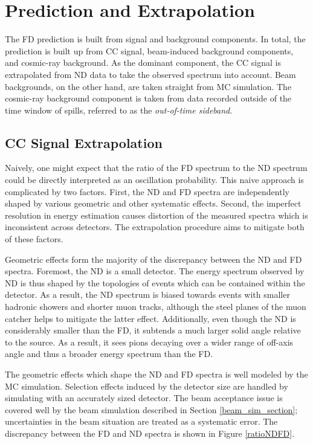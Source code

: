 \section{Prediction and Extrapolation}
\label{extrap_section}

The FD prediction is built from signal and background components.
In total, the prediction is built up from \numu CC signal, beam-induced
background components, and cosmic-ray background.
As the dominant component, the \numu CC signal is extrapolated from
ND data to take the observed spectrum into account.
Beam backgrounds, on the other hand, are taken straight from MC simulation.
The cosmic-ray background component is taken from data recorded
outside of the time window of \numi spills, referred to as the
\textit{out-of-time sideband}.

\subsection{\numu CC Signal Extrapolation}
\label{sig_extrap_section}
Naively, one might expect that the ratio of the FD spectrum to the ND spectrum
could be directly interpreted as an oscillation probability.
This naive approach is complicated by two factors.
First, the ND and FD spectra are independently shaped by various geometric
and other systematic effects.
Second, the imperfect resolution in energy estimation causes
distortion of the measured spectra which is inconsistent across detectors.
The extrapolation procedure aims to mitigate both of these factors.

Geometric effects form the majority of the discrepancy between the
ND and FD spectra.
Foremost, the ND is a small detector.
The energy spectrum observed by ND is thus shaped by the topologies
of events which can be contained within the detector.
As a result, the ND spectrum is biased towards events with
smaller hadronic showers and shorter muon tracks, although the steel planes
of the muon catcher helps to mitigate the latter effect.
Additionally, even though the ND is considerably smaller than the FD,
it subtends a much larger solid angle relative to the \numi source.
As a result, it sees pions decaying over a wider range of off-axis angle
and thus a broader energy spectrum than the FD.


The geometric effects which shape the ND and FD spectra is well modeled
by the MC simulation.
Selection effects induced by the detector size are handled by simulating
with an accurately sized detector.
The beam acceptance issue is covered well by the beam simulation described in
Section \ref{beam_sim_section}; uncertainties in the beam situation are
treated as a systematic error.
The discrepancy between the FD and ND spectra is shown in Figure
\ref{ratioNDFD}.


